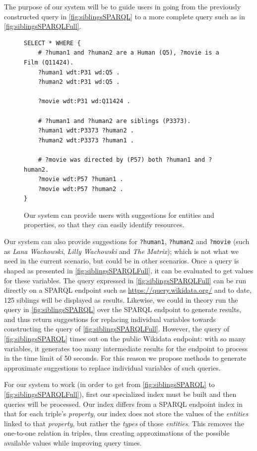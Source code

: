 The purpose of our system will be to guide users in going from the previously constructed query in \autoref{fig:siblingsSPARQL} to a more complete query such as in \autoref{fig:siblingsSPARQLFull}.

\begin{figure}[H]
\begin{verbatim}
SELECT * WHERE {
    # ?human1 and ?human2 are a Human (Q5), ?movie is a Film (Q11424).
    ?human1 wdt:P31 wd:Q5 .
    ?human2 wdt:P31 wd:Q5 .
    
    ?movie wdt:P31 wd:Q11424 .
    
    # ?human1 and ?human2 are siblings (P3373).
    ?human1 wdt:P3373 ?human2 .
    ?human2 wdt:P3373 ?human1 .
    
    # ?movie was directed by (P57) both ?human1 and ?human2.
    ?movie wdt:P57 ?human1 .
    ?movie wdt:P57 ?human2 .
}
\end{verbatim}
\caption{Our system can provide users with suggestions for entities and properties, so that they can easily identify resources.}
\label{fig:siblingsSPARQLFull}
\end{figure}

Our system can also provide suggestions for \texttt{?human1}, \texttt{?human2} and \texttt{?movie} (such as \textit{Lana Wachowski}, \textit{Lilly Wachowski} and \textit{The Matrix}); which is not what we need in the current scenario, but could be in other scenarios. Once a query is shaped as presented in \autoref{fig:siblingsSPARQLFull}, it can be evaluated to get values for these variables. The query expressed in \autoref{fig:siblingsSPARQLFull} can be run directly on a SPARQL endpoint such as \url{https://query.wikidata.org/} and to date, 125 siblings will be displayed as results. Likewise, we could in theory run the query in \autoref{fig:siblingsSPARQL} over the SPARQL endpoint to generate results, and thus return suggestions for replacing individual variables towards constructing the query of \autoref{fig:siblingsSPARQLFull}. However, the query of \autoref{fig:siblingsSPARQL} times out on the public Wikidata endpoint: with so many variables, it generates too many intermediate results for the endpoint to process in the time limit of 50 seconds. For this reason we propose methods to generate approximate suggestions to replace individual variables of such queries.

For our system to work (in order to get from \autoref{fig:siblingsSPARQL} to \autoref{fig:siblingsSPARQLFull}), first our specialized index must be built and then queries will be processed. Our index differs from a SPARQL endpoint index in that for each triple's \textit{property}, our index does not store the values of the \textit{entities} linked to that \textit{property}, but rather the \textit{types} of those \textit{entities}. This removes the one-to-one relation in triples, thus creating approximations of the possible available values while improving query times.

